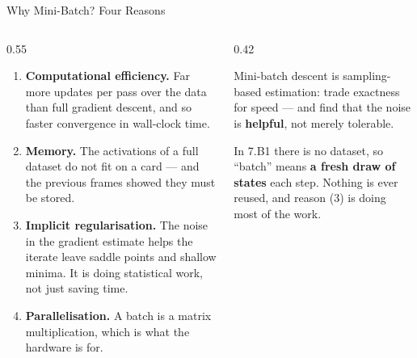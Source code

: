 \begin{frame}{Why Mini-Batch? Four Reasons}
\begin{columns}[T]
\begin{column}{0.55\textwidth}
\small
\begin{enumerate}\small\setlength{\itemsep}{1.4mm}
  \item \textbf{Computational efficiency.} Far more updates per pass over the data than full gradient descent, and so faster convergence in wall-clock time.
  \item \textbf{Memory.} The activations of a full dataset do not fit on a card --- and the previous frames showed they must be stored.
  \item \textbf{Implicit regularisation.} The noise in the gradient estimate helps the iterate leave saddle points and shallow minima. It is doing statistical work, not just saving time.
  \item \textbf{Parallelisation.} A batch is a matrix multiplication, which is what the hardware is for.
\end{enumerate}
\end{column}
\begin{column}{0.42\textwidth}
\begin{takeawaybox}[title=\textbf{The econometric analogue}]\small
Mini-batch descent is sampling-based estimation: trade exactness for speed --- and find that the noise is \textbf{helpful}, not merely tolerable.
\end{takeawaybox}
\medskip
\begin{examplebox}\footnotesize
In 7.B1 there is no dataset, so ``batch'' means \textbf{a fresh draw of states} each step. Nothing is ever reused, and reason (3) is doing most of the work.
\end{examplebox}
\end{column}
\end{columns}
\end{frame}

